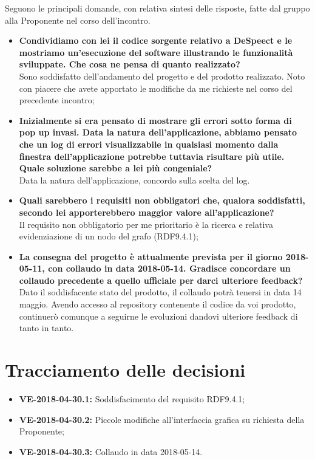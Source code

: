 \documentclass[openany,12pt,a4paper]{article}
\begin{document}
  \noindent Seguono le principali domande, con relativa sintesi delle risposte, fatte dal gruppo alla Proponente nel corso dell'incontro.
	
  \begin{itemize}
	
	\item \textbf{Condividiamo con lei il codice sorgente relativo a DeSpeect e le mostriamo un'esecuzione del software illustrando le funzionalità sviluppate. Che cosa ne pensa di quanto realizzato?} \\
	Sono soddisfatto dell'andamento del progetto e del prodotto realizzato. Noto con piacere che avete apportato le modifiche da me richieste nel corso del precedente incontro;
	
	\item \textbf{Inizialmente si era pensato di mostrare gli errori sotto forma di pop up invasi. Data la natura dell'applicazione, abbiamo pensato che un log di errori visualizzabile in qualsiasi momento dalla finestra dell'applicazione potrebbe tuttavia risultare più utile. Quale soluzione sarebbe a lei più congeniale?} \\
	Data la natura dell'applicazione, concordo sulla scelta del log.
	
	\item \textbf{Quali sarebbero i requisiti non obbligatori che, qualora soddisfatti,  secondo lei apporterebbero maggior valore all'applicazione?} \\
	Il requisito non obbligatorio per me prioritario è la ricerca e relativa evidenziazione di un nodo del grafo (RDF9.4.1);
	
	\item \textbf{La consegna del progetto è attualmente prevista per il giorno 2018-05-11, con collaudo in data 2018-05-14. Gradisce concordare un collaudo precedente a quello ufficiale per darci ulteriore feedback?} \\
	Dato il soddisfacente stato del prodotto, il collaudo potrà tenersi in data 14 maggio. Avendo accesso al repository contenente il codice da voi prodotto, continuerò comunque a seguirne le evoluzioni dandovi ulteriore feedback di tanto in tanto.
	
  \end{itemize}
 
  \section{Tracciamento delle decisioni} 
   
  \begin{itemize} 
  	
      \item \textbf{VE-2018-04-30.1:} Soddisfacimento del requisito RDF9.4.1;
      \item \textbf{VE-2018-04-30.2:} Piccole modifiche all'interfaccia grafica su richiesta della Proponente;
      \item \textbf{VE-2018-04-30.3:} Collaudo in data 2018-05-14.
      
  \end{itemize} 
   
  
\end{document}
